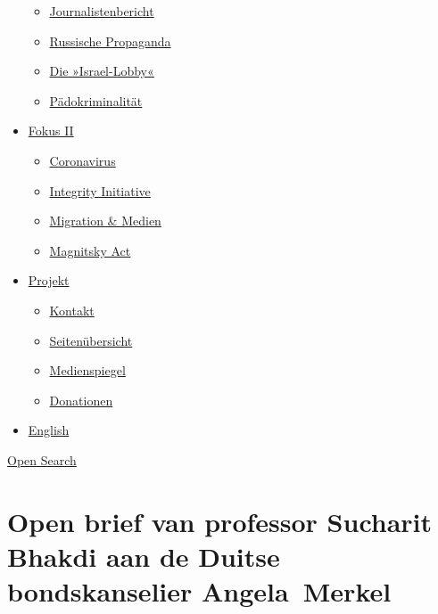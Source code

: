 \begin{itemize}
  \begin{itemize}
  \tightlist
  \item
    \href{https://swprs.org/bericht-eines-journalisten/}{Journalistenbericht}
  \item
    \href{https://swprs.org/russische-propaganda/}{Russische Propaganda}
  \item
    \href{https://swprs.org/die-israel-lobby-fakten-und-mythen/}{Die
    »Israel-Lobby«}
  \item
    \href{https://swprs.org/geopolitik-und-paedokriminalitaet/}{Pädokriminalität}
  \end{itemize}
\item
  \href{https://swprs.org/migration-und-medien/}{Fokus II}

  \begin{itemize}
  \tightlist
  \item
    \href{https://swprs.org/covid-19-hinweis-ii/}{Coronavirus}
  \item
    \href{https://swprs.org/die-integrity-initiative/}{Integrity
    Initiative}
  \item
    \href{https://swprs.org/migration-und-medien/}{Migration \& Medien}
  \item
    \href{https://swprs.org/der-fall-magnitsky/}{Magnitsky Act}
  \end{itemize}
\item
  \href{https://swprs.org/kontakt/}{Projekt}

  \begin{itemize}
  \tightlist
  \item
    \href{https://swprs.org/kontakt/}{Kontakt}
  \item
    \href{https://swprs.org/uebersicht/}{Seitenübersicht}
  \item
    \href{https://swprs.org/medienspiegel/}{Medienspiegel}
  \item
    \href{https://swprs.org/donationen/}{Donationen}
  \end{itemize}
\item
  \href{https://swprs.org/contact/}{English}
\end{itemize}

\protect\hyperlink{}{Open Search}

\hypertarget{open-brief-van-professor-sucharit-bhakdi-aan-de-duitse-bondskanselier-angela-merkel}{%
\section{Open brief van professor Sucharit Bhakdi aan de Duitse
bondskanselier
Angela~Merkel}\label{open-brief-van-professor-sucharit-bhakdi-aan-de-duitse-bondskanselier-angela-merkel}}

